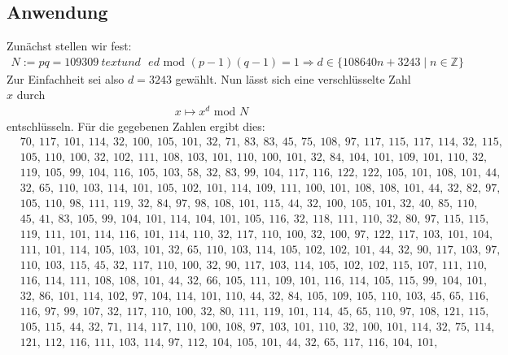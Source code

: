 \documentclass[ngerman]{fbi-aufgabenblatt}
\begin{document}
\subsection{Anwendung}
Zunächst stellen wir fest:
\begin{align*}
N:= pq= 109309 ~text{ und }~~~ ed \text{ mod }(p-1)(q-1)=1 \Rightarrow d\in \{ 108640n+3243 \mid n \in \mathbb{Z} \} 
\end{align*}
Zur Einfachheit sei also $d= 3243$ gewählt. Nun lässt sich eine verschlüsselte Zahl $x$ durch 
\begin{align*}
x \mapsto x^d \text{ mod }N
\end{align*}
entschlüsseln. Für die gegebenen Zahlen ergibt dies:
\begin{align*}
& 70,~ 117,~ 101,~ 114,~ 32,~ 100,~ 105,~ 101,~ 32,~ 71,~ 83,~ 83,~ 45,~ 75,~ 108,~ 97,~ 117,~ 115,~ 117,~ 114,~ 32,~ 115,~
\\& 105,~ 110,~ 100,~ 32,~ 102,~ 111,~ 108,~ 103,~ 101,~ 110,~ 100,~ 101,~ 32,~ 84,~ 104,~ 101,~ 109,~ 101,~ 110,~ 32,~ 
\\& 119,~ 105,~ 99,~ 104,~ 116,~ 105,~ 103,~ 58,~ 32,~ 83,~ 99,~ 104,~ 117,~ 116,~ 122,~ 122,~ 105,~ 101,~ 108,~ 101,~ 44,~ 
\\& 32,~ 65,~ 110,~ 103,~ 114,~ 101,~ 105,~ 102,~ 101,~ 114,~ 109,~ 111,~ 100,~ 101,~ 108,~ 108,~ 101,~ 44,~ 32,~ 82,~ 97,~ \\& 105,~ 110,~ 98,~ 111,~ 119,~ 32,~ 84,~ 97,~ 98,~ 108,~ 101,~ 115,~ 44,~ 32,~ 100,~ 105,~ 101,~ 32,~ 40,~ 85,~ 110,~   \\& 45,~ 41,~ 83,~ 105,~ 99,~ 104,~ 101,~ 114,~ 104,~ 101,~ 105,~ 116,~ 32,~ 118,~ 111,~ 110,~ 32,~ 80,~ 97,~ 115,~ 115,~  \\& 119,~ 111,~ 101,~ 114,~ 116,~ 101,~ 114,~ 110,~ 32,~ 117,~ 110,~ 100,~ 32,~ 100,~ 97,~ 122,~ 117,~ 103,~ 101,~ 104,~  \\& 111,~ 101,~ 114,~ 105,~ 103,~ 101,~ 32,~ 65,~ 110,~ 103,~ 114,~ 105,~ 102,~ 102,~ 101,~ 44,~ 32,~ 90,~ 117,~ 103,~ 97,~
\\& 110,~ 103,~ 115,~ 45,~ 32,~ 117,~ 110,~ 100,~ 32,~ 90,~ 117,~ 103,~ 114,~ 105,~ 102,~ 102,~ 115,~ 107,~ 111,~ 110,~  \\& 116,~ 114,~ 111,~ 108,~ 108,~ 101,~ 44,~ 32,~ 66,~ 105,~ 111,~ 109,~ 101,~ 116,~ 114,~ 105,~ 115,~ 99,~ 104,~ 101,~  \\& 32,~ 86,~ 101,~ 114,~ 102,~ 97,~ 104,~ 114,~ 101,~ 110,~ 44,~ 32,~ 84,~ 105,~ 109,~ 105,~ 110,~ 103,~ 45,~ 65,~ 116,~  \\&
 116,~ 97,~ 99 ,~107,~ 32,~ 117,~ 110,~ 100,~ 32 ,~80 ,~111 ,~119 ,~101,~ 114,~ 45,~ 65,~ 110,~ 97,~ 108,~ 121,~ 115,~  \\& 105,~ 115,~ 44 ,~32,~ 71,~ 114 ,~117,~ 110,~ 100,~ 108,~ 97,~ 103,~ 101,~ 110,~ 32,~ 100,~ 101,~ 114,~ 32,~ 75,~ 114,~  \\& 121,~ 112,~ 116,~ 111,~ 103,~ 114,~ 97,~ 112,~ 104,~ 105 ,~101,~ 44,~ 32,~ 65,~ 117,~ 116,~ 104,~ 101,~   \end{align*}
\end{document}
